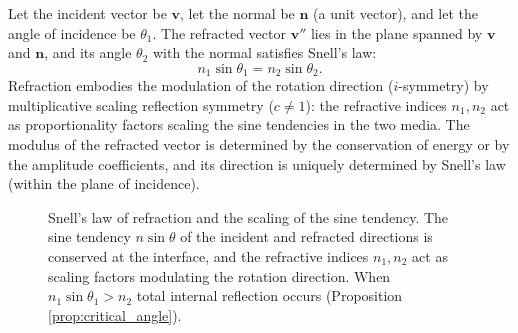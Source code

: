 \begin{definition}\label{def:refraction_vector}
Let the incident vector be $\mathbf{v}$, let the normal be $\mathbf{n}$ (a unit vector), and let the angle of incidence be $\theta_1$. The refracted vector $\mathbf{v}''$ lies in the plane spanned by $\mathbf{v}$ and $\mathbf{n}$, and its angle $\theta_2$ with the normal satisfies Snell's law:
\[n_1 \sin\theta_1 = n_2 \sin\theta_2.\]
Refraction embodies the modulation of the rotation direction ($i$-symmetry) by multiplicative scaling reflection symmetry ($c \neq 1$): the refractive indices $n_1, n_2$ act as proportionality factors scaling the sine tendencies in the two media. The modulus of the refracted vector is determined by the conservation of energy or by the amplitude coefficients, and its direction is uniquely determined by Snell's law (within the plane of incidence).
\end{definition}

\begin{figure}[htbp]
    \centering
    \caption{Snell's law of refraction and the scaling of the sine tendency. The sine tendency $n\sin\theta$ of the incident and refracted directions is conserved at the interface, and the refractive indices $n_1,n_2$ act as scaling factors modulating the rotation direction. When $n_1\sin\theta_1 > n_2$ total internal reflection occurs (Proposition \ref{prop:critical_angle}).}
    \label{fig:refraction_snell}
\end{figure}

